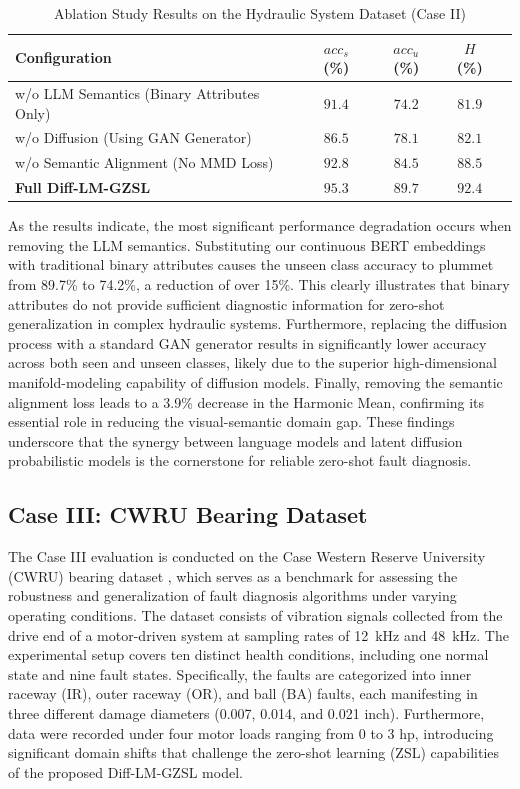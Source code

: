 \documentclass[journal]{IEEEtran}
\begin{document}
\begin{table}[htbp]
\centering
\caption{Ablation Study Results on the Hydraulic System Dataset (Case II)}
\label{tab:ablation}
\begin{tabular}{lcccc}
\toprule
Configuration & $acc_s$ (\%) & $acc_u$ (\%) & $H$ (\%) \\
\midrule
w/o LLM Semantics (Binary Attributes Only) & $91.4$ & $74.2$ & $81.9$ \\
w/o Diffusion (Using GAN Generator) & $86.5$ & $78.1$ & $82.1$ \\
w/o Semantic Alignment (No MMD Loss) & $92.8$ & $84.5$ & $88.5$ \\
\textbf{Full Diff-LM-GZSL} & $\mathbf{95.3}$ & $\mathbf{89.7}$ & $\mathbf{92.4}$ \\
\bottomrule
\end{tabular}
\end{table}

As the results indicate, the most significant performance degradation occurs when removing the LLM semantics. Substituting our continuous BERT embeddings with traditional binary attributes causes the unseen class accuracy to plummet from 89.7\% to 74.2\%, a reduction of over 15\%. This clearly illustrates that binary attributes do not provide sufficient diagnostic information for zero-shot generalization in complex hydraulic systems. Furthermore, replacing the diffusion process with a standard GAN generator results in significantly lower accuracy across both seen and unseen classes, likely due to the superior high-dimensional manifold-modeling capability of diffusion models. Finally, removing the semantic alignment loss leads to a 3.9\% decrease in the Harmonic Mean, confirming its essential role in reducing the visual-semantic domain gap. These findings underscore that the synergy between language models and latent diffusion probabilistic models is the cornerstone for reliable zero-shot fault diagnosis.

\subsection{Case III: CWRU Bearing Dataset}
The Case III evaluation is conducted on the Case Western Reserve University (CWRU) bearing dataset \cite{Smith2015CWRU}, which serves as a benchmark for assessing the robustness and generalization of fault diagnosis algorithms under varying operating conditions. The dataset consists of vibration signals collected from the drive end of a motor-driven system at sampling rates of 12~kHz and 48~kHz. The experimental setup covers ten distinct health conditions, including one normal state and nine fault states. Specifically, the faults are categorized into inner raceway (IR), outer raceway (OR), and ball (BA) faults, each manifesting in three different damage diameters (0.007, 0.014, and 0.021 inch). Furthermore, data were recorded under four motor loads ranging from 0 to 3 hp, introducing significant domain shifts that challenge the zero-shot learning (ZSL) capabilities of the proposed Diff-LM-GZSL model.
\end{document}

